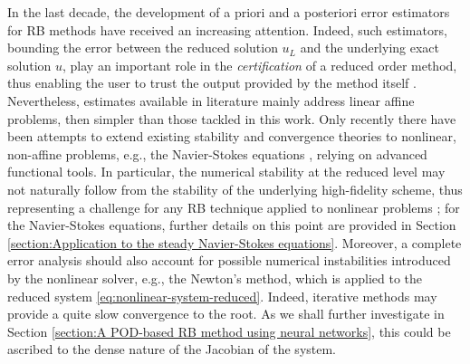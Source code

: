 \documentclass[12pt, a4paper, twoside, openright]{report}
\numberwithin{equation}{chapter}
\theoremstyle{theorem}
\theoremstyle{definition}
\theoremstyle{remark}
\theoremstyle{proposition}
\numberwithin{figure}{chapter}
\begin{document}
		In the last decade, the development of a priori and a posteriori error estimators for RB methods have received an increasing attention. Indeed, such estimators, bounding the error between the reduced solution $u_L$ and the underlying exact solution $u$, play an important role in the \emph{certification} of a reduced order method, thus enabling the user to trust the output provided by the method itself \cite{HSR16}. Nevertheless, estimates available in literature mainly address linear affine problems, then simpler than those tackled in this work. Only recently there have been attempts to extend existing stability and convergence theories to nonlinear, non-affine problems, e.g., the Navier-Stokes equations \cite{QMN15}, relying on advanced functional tools. In particular, the numerical stability at the reduced level may not naturally follow from the stability of the underlying high-fidelity scheme, thus representing a challenge for any RB technique applied to nonlinear problems \cite{Bal14}; for the Navier-Stokes equations, further details on this point are provided in Section \ref{section:Application to the steady Navier-Stokes equations}. Moreover, a complete error analysis should also account for possible numerical instabilities introduced by the nonlinear solver, e.g., the Newton's method, which is applied to the reduced system \eqref{eq:nonlinear-system-reduced}. Indeed, iterative methods may provide a quite slow convergence to the root. As we shall further investigate in Section \ref{section:A POD-based RB method using neural networks}, this could be ascribed to the dense nature of the Jacobian of the system.
		

		
\end{document}
